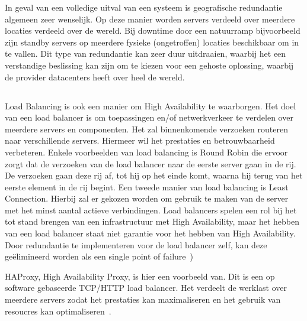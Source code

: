 In geval van een volledige uitval van een systeem is geografische redundantie algemeen zeer wenselijk. Op deze manier worden servers verdeeld over meerdere locaties verdeeld over de wereld. Bij downtime door een natuurramp bijvoorbeeld zijn standby servers op meerdere fysieke (ongetroffen) locaties beschikbaar om in te vallen. Dit type van redundantie kan zeer duur uitdraaien, waarbij het een verstandige beslissing kan zijn om te kiezen voor een gehoste oplossing, waarbij de provider datacenters heeft over heel de wereld.

\subsection{}
\label{subsec:Load Balancing}

Load Balancing is ook een manier om High Availability te waarborgen. Het doel van een load balancer is om toepassingen en/of netwerkverkeer te verdelen over meerdere servers en componenten. Het zal binnenkomende verzoeken routeren naar verschillende servers. Hiermeer wil het prestaties en betrouwbaarheid verbeteren. Enkele voorbeelden van load balancing is Round Robin die ervoor zorgt dat de verzoeken van de load balancer naar de eerste server gaan in de rij. De verzoeken gaan deze rij af, tot hij op het einde komt, waarna hij terug van het eerste element in de rij begint. Een tweede manier van load balancing is Least Connection. Hierbij zal er gekozen worden om gebruik te maken van de server met het minst aantal actieve verbindingen. Load balancers spelen een rol bij het tot stand brengen van een infrastructuur met High Availability, maar het hebben van een load balancer staat niet garantie voor het hebben van High Availability. Door redundantie te implementeren voor de load balancer zelf, kan deze geëlimineerd worden als een single point of failure~\autocite{Jevtic2018})

HAProxy, High Availability Proxy, is hier een voorbeeld van. Dit is een op software gebaseerde TCP/HTTP load balancer. Het verdeelt de werklast over meerdere servers zodat het prestaties kan maximaliseren en het gebruik van resoucres kan optimaliseren~\autocite{SeveralNines2020}.

\subsection{}
\label{subsec:Schaalbaarheid}

